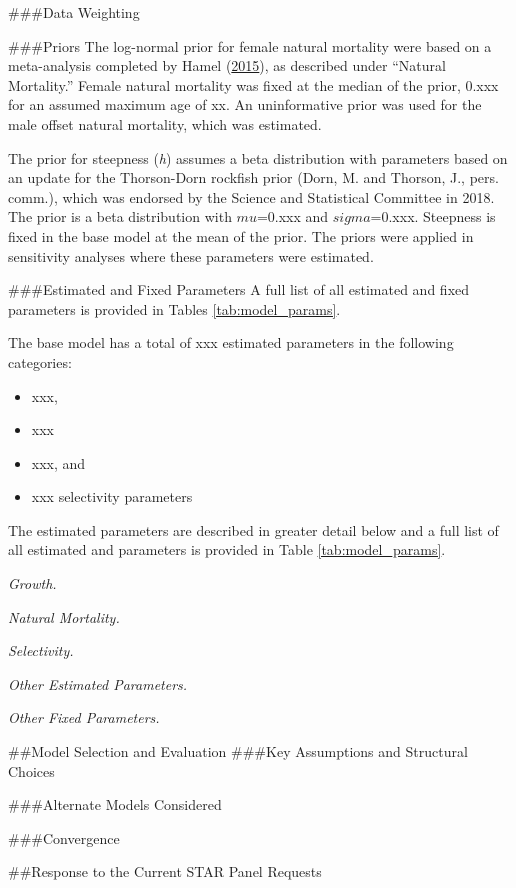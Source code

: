 \documentclass[12pt,]{article}
\begin{document}
\#\#\#Data Weighting

\#\#\#Priors The log-normal prior for female natural mortality were
based on a meta-analysis completed by Hamel
(\protect\hyperlink{ref-Hamel2015}{2015}), as described under ``Natural
Mortality.'' Female natural mortality was fixed at the median of the
prior, 0.xxx for an assumed maximum age of xx. An uninformative prior
was used for the male offset natural mortality, which was estimated.

The prior for steepness (\emph{h}) assumes a beta distribution with
parameters based on an update for the Thorson-Dorn rockfish prior (Dorn,
M. and Thorson, J., pers. comm.), which was endorsed by the Science and
Statistical Committee in 2018. The prior is a beta distribution with
\(mu\)=0.xxx and \(sigma\)=0.xxx. Steepness is fixed in the base model
at the mean of the prior. The priors were applied in sensitivity
analyses where these parameters were estimated.

\#\#\#Estimated and Fixed Parameters A full list of all estimated and
fixed parameters is provided in Tables \ref{tab:model_params}.

The base model has a total of xxx estimated parameters in the following
categories:

\begin{itemize}
  \item xxx,
  \item xxx
  \item xxx, and
  \item xxx selectivity parameters
\end{itemize}

The estimated parameters are described in greater detail below and a
full list of all estimated and parameters is provided in Table
\ref{tab:model_params}.

\emph{Growth.}

\emph{Natural Mortality.}

\emph{Selectivity.}

\emph{Other Estimated Parameters.}

\emph{Other Fixed Parameters.}

\#\#Model Selection and Evaluation \#\#\#Key Assumptions and Structural
Choices

\#\#\#Alternate Models Considered

\#\#\#Convergence

\#\#Response to the Current STAR Panel Requests
\end{document}
